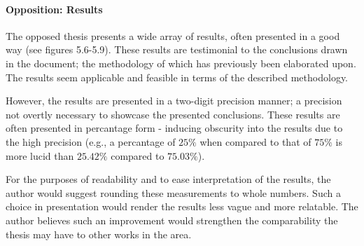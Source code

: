 
\paragraph{Opposition: Results}
\label{par:oppositionresults}
The opposed thesis presents a wide array of results, often presented in a good way (see figures 5.6-5.9).
These results are testimonial to the conclusions drawn in the document; the methodology of which has previously been elaborated upon.
The results seem applicable and feasible in terms of the described methodology.

However, the results are presented in a two-digit precision manner; a precision not overtly necessary to showcase the presented conclusions.
These results are often presented in percantage form - inducing obscurity into the results due to the high precision (e.g., a percantage of $25\%$ when compared to that of $75\%$ is more lucid than $25.42\%$ compared to $75.03\%$).

For the purposes of readability and to ease interpretation of the results, the author would suggest rounding these measurements to whole numbers.
Such a choice in presentation would render the results less vague and more relatable.
The author believes such an improvement would strengthen the comparability the thesis may have to other works in the area.
